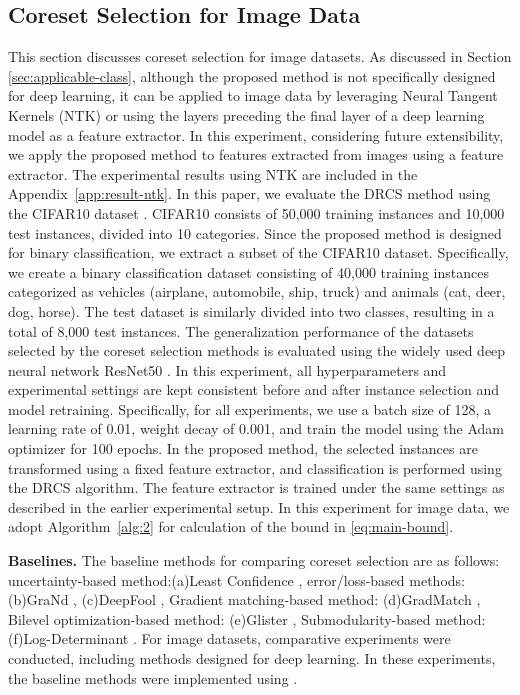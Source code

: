 \subsection{Coreset Selection for Image Data}
	\label{subsec:result-image}
	This section discusses coreset selection for image datasets. As discussed in Section \ref{sec:applicable-class}, although the proposed method is not specifically designed for deep learning, it can be applied to image data by leveraging Neural Tangent Kernels (NTK)\citep{neuraltangents2020} or using the layers preceding the final layer of a deep learning model as a feature extractor.
	In this experiment, considering future extensibility, we apply the proposed method to features extracted from images using a feature extractor.
	The experimental results using NTK are included in the Appendix~\ref{app:result-ntk}.
	In this paper, we evaluate the DRCS method using the CIFAR10 dataset \citep{cifar10}.  
	CIFAR10 consists of 50,000 training instances and 10,000 test instances, divided into 10 categories.  
	Since the proposed method is designed for binary classification, we extract a subset of the CIFAR10 dataset.  
	Specifically, we create a binary classification dataset consisting of 40,000 training instances categorized as vehicles (airplane, automobile, ship, truck) and animals (cat, deer, dog, horse).  
	The test dataset is similarly divided into two classes, resulting in a total of 8,000 test instances.  
	The generalization performance of the datasets selected by the coreset selection methods is evaluated using the widely used deep neural network ResNet50 \citep{he2016deep}.  
	In this experiment, all hyperparameters and experimental settings are kept consistent before and after instance selection and model retraining.  
	Specifically, for all experiments, we use a batch size of 128, a learning rate of 0.01, weight decay of 0.001, and train the model using the Adam optimizer for 100 epochs.  
	In the proposed method, the selected instances are transformed using a fixed feature extractor, and classification is performed using the DRCS algorithm.  
	The feature extractor is trained under the same settings as described in the earlier experimental setup.
	In this experiment for image data, we adopt Algorithm~\ref{alg:2} for calculation of the bound in \eqref{eq:main-bound}.
	
	{\bf Baselines.} The baseline methods for comparing coreset selection are as follows:
	uncertainty-based method:(a)Least Confidence \citep{coleman2019selection}, error/loss-based methods: (b)GraNd \citep{paul2021deep}, (c)DeepFool \citep{ducoffe2018adversarial}, Gradient matching-based method: (d)GradMatch \citep{killamsetty2021grad}, Bilevel optimization-based method: (e)Glister \citep{killamsetty2021glister}, Submodularity-based method: (f)Log-Determinant \citep{iyer2021submodular}.
	For image datasets, comparative experiments were conducted, including methods designed for deep learning.
	In these experiments, the baseline methods were implemented using \citet{guo2022deepcore}.


